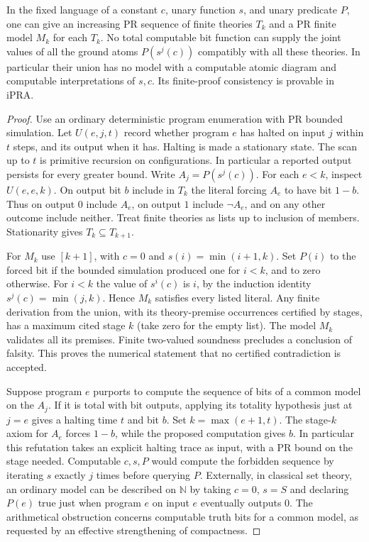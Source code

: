 \begin{theorem}\label{thm:nocompmodel}
In the fixed language of a constant $c$, unary function $s$, and unary predicate $P$, one can give an increasing PR sequence of finite theories $T_k$ and a PR finite model $M_k$ for each $T_k$. No total computable bit function can supply the joint values of all the ground atoms $P(s^j(c))$ compatibly with all these theories. In particular their union has no model with a computable atomic diagram and computable interpretations of $s,c$. Its finite-proof consistency is provable in iPRA.
\end{theorem}
\begin{proof}
Use an ordinary deterministic program enumeration with PR bounded simulation. Let $U(e,j,t)$ record whether program $e$ has halted on input $j$ within $t$ steps, and its output when it has. Halting is made a stationary state. The scan up to $t$ is primitive recursion on configurations. In particular a reported output persists for every greater bound. Write $A_j=P(s^j(c))$. For each $e<k$, inspect $U(e,e,k)$. On output bit $b$ include in $T_k$ the literal forcing $A_e$ to have bit $1-b$. Thus on output $0$ include $A_e$, on output $1$ include $\neg A_e$, and on any other outcome include neither. Treat finite theories as lists up to inclusion of members. Stationarity gives $T_k\subseteq T_{k+1}$.

For $M_k$ use $[k+1]$, with $c=0$ and $s(i)=\min(i+1,k)$. Set $P(i)$ to the forced bit if the bounded simulation produced one for $i<k$, and to zero otherwise. For $i<k$ the value of $s^i(c)$ is $i$, by the induction identity $s^j(c)=\min(j,k)$. Hence $M_k$ satisfies every listed literal. Any finite derivation from the union, with its theory-premise occurrences certified by stages, has a maximum cited stage $k$ (take zero for the empty list). The model $M_k$ validates all its premises. Finite two-valued soundness precludes a conclusion of falsity. This proves the numerical statement that no certified contradiction is accepted.

Suppose program $e$ purports to compute the sequence of bits of a common model on the $A_j$. If it is total with bit outputs, applying its totality hypothesis just at $j=e$ gives a halting time $t$ and bit $b$. Set $k=\max(e+1,t)$. The stage-$k$ axiom for $A_e$ forces $1-b$, while the proposed computation gives $b$. In particular this refutation takes an explicit halting trace as input, with a PR bound on the stage needed. Computable $c,s,P$ would compute the forbidden sequence by iterating $s$ exactly $j$ times before querying $P$. Externally, in classical set theory, an ordinary model can be described on $\mathbb N$ by taking $c=0$, $s=S$ and declaring $P(e)$ true just when program $e$ on input $e$ eventually outputs $0$. The arithmetical obstruction concerns computable truth bits for a common model, as requested by an effective strengthening of compactness.
\end{proof}

